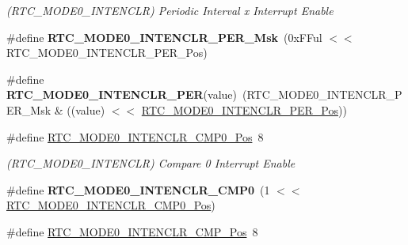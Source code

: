 \begin{DoxyCompactItemize}
\begin{DoxyCompactList}\small\item\em (R\+T\+C\+\_\+\+M\+O\+D\+E0\+\_\+\+I\+N\+T\+E\+N\+C\+L\+R) Periodic Interval x Interrupt Enable \end{DoxyCompactList}\item 
\hypertarget{group___s_a_m_l21___r_t_c_ga24a9c96cb486ab1ba9cd55c712d5d86b}{}\#define {\bfseries R\+T\+C\+\_\+\+M\+O\+D\+E0\+\_\+\+I\+N\+T\+E\+N\+C\+L\+R\+\_\+\+P\+E\+R\+\_\+\+Msk}~(0x\+F\+Ful $<$$<$ R\+T\+C\+\_\+\+M\+O\+D\+E0\+\_\+\+I\+N\+T\+E\+N\+C\+L\+R\+\_\+\+P\+E\+R\+\_\+\+Pos)\label{group___s_a_m_l21___r_t_c_ga24a9c96cb486ab1ba9cd55c712d5d86b}

\item 
\hypertarget{group___s_a_m_l21___r_t_c_gab94ba2e65a401752606dea2c03cadd22}{}\#define {\bfseries R\+T\+C\+\_\+\+M\+O\+D\+E0\+\_\+\+I\+N\+T\+E\+N\+C\+L\+R\+\_\+\+P\+E\+R}(value)~(R\+T\+C\+\_\+\+M\+O\+D\+E0\+\_\+\+I\+N\+T\+E\+N\+C\+L\+R\+\_\+\+P\+E\+R\+\_\+\+Msk \& ((value) $<$$<$ \hyperlink{group___s_a_m_l21___r_t_c_ga7fee20bc7d911c8daa8d8da2bd58ba97}{R\+T\+C\+\_\+\+M\+O\+D\+E0\+\_\+\+I\+N\+T\+E\+N\+C\+L\+R\+\_\+\+P\+E\+R\+\_\+\+Pos}))\label{group___s_a_m_l21___r_t_c_gab94ba2e65a401752606dea2c03cadd22}

\item 
\hypertarget{group___s_a_m_l21___r_t_c_gab521eae8df596528246970da4a7062ba}{}\#define \hyperlink{group___s_a_m_l21___r_t_c_gab521eae8df596528246970da4a7062ba}{R\+T\+C\+\_\+\+M\+O\+D\+E0\+\_\+\+I\+N\+T\+E\+N\+C\+L\+R\+\_\+\+C\+M\+P0\+\_\+\+Pos}~8\label{group___s_a_m_l21___r_t_c_gab521eae8df596528246970da4a7062ba}

\begin{DoxyCompactList}\small\item\em (R\+T\+C\+\_\+\+M\+O\+D\+E0\+\_\+\+I\+N\+T\+E\+N\+C\+L\+R) Compare 0 Interrupt Enable \end{DoxyCompactList}\item 
\hypertarget{group___s_a_m_l21___r_t_c_ga2ba1ada9e67200153e31878f7ac1ce03}{}\#define {\bfseries R\+T\+C\+\_\+\+M\+O\+D\+E0\+\_\+\+I\+N\+T\+E\+N\+C\+L\+R\+\_\+\+C\+M\+P0}~(1 $<$$<$ \hyperlink{group___s_a_m_l21___r_t_c_gab521eae8df596528246970da4a7062ba}{R\+T\+C\+\_\+\+M\+O\+D\+E0\+\_\+\+I\+N\+T\+E\+N\+C\+L\+R\+\_\+\+C\+M\+P0\+\_\+\+Pos})\label{group___s_a_m_l21___r_t_c_ga2ba1ada9e67200153e31878f7ac1ce03}

\item 
\hypertarget{group___s_a_m_l21___r_t_c_gafdb78dfafb520b259ef9365687c6b010}{}\#define \hyperlink{group___s_a_m_l21___r_t_c_gafdb78dfafb520b259ef9365687c6b010}{R\+T\+C\+\_\+\+M\+O\+D\+E0\+\_\+\+I\+N\+T\+E\+N\+C\+L\+R\+\_\+\+C\+M\+P\+\_\+\+Pos}~8\label{group___s_a_m_l21___r_t_c_gafdb78dfafb520b259ef9365687c6b010}


\end{DoxyCompactItemize}
